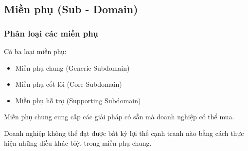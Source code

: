 \documentclass{article} %
\begin{document}

%  

 





% 

\subsection{Miền phụ (Sub - Domain)}





\subsubsection{Phân loại các miền phụ }

Có ba loại miền phụ:

\begin{itemize}

    \item Miền phụ chung (Generic Subdomain)

    \item Miền phụ cốt lõi (Core Subdomain)

    \item Miền phụ hỗ trợ (Supporting Subdomain)

\end{itemize}



Miền phụ chung cung cấp các giải pháp có sẵn mà doanh nghiệp có thể mua.

Doanh nghiệp không thể đạt được bất kỳ lợi thế cạnh tranh nào bằng cách thực hiện những điều khác biệt trong miền phụ chung.


\end{document}
